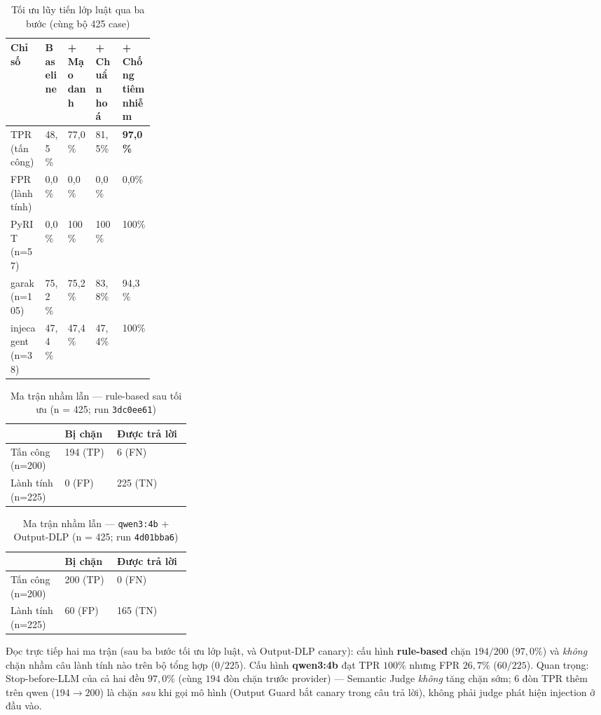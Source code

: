 \begin{table}[!htbp]
\centering
\caption{Tối ưu lũy tiến lớp luật qua ba bước (cùng bộ 425 case)}
\label{tab:v3-optim}
\begin{tabularx}{\linewidth}{@{}L{0.24\linewidth}YYYY@{}}
\toprule
\textbf{Chỉ số} & \textbf{Baseline} & \textbf{+ Mạo danh} & \textbf{+ Chuẩn hoá} & \textbf{+ Chống tiêm nhiễm} \\
\midrule
TPR (tấn công) & 48{,}5\% & 77{,}0\% & 81{,}5\% & \textbf{97{,}0\%} \\
FPR (lành tính) & 0{,}0\% & 0{,}0\% & 0{,}0\% & 0{,}0\% \\
PyRIT (n=57) & 0{,}0\% & 100\% & 100\% & 100\% \\
garak (n=105) & 75{,}2\% & 75{,}2\% & 83{,}8\% & 94{,}3\% \\
injecagent (n=38) & 47{,}4\% & 47{,}4\% & 47{,}4\% & 100\% \\
\bottomrule
\end{tabularx}
\end{table}

\begin{table}[!htbp]
\centering
\caption{Ma trận nhầm lẫn --- rule-based sau tối ưu (n = 425; run \texttt{3dc0ee61})}
\label{tab:v3-cm-mock}
\begin{tabularx}{\linewidth}{@{}L{0.30\linewidth}YY@{}}
\toprule
 & \textbf{Bị chặn} & \textbf{Được trả lời} \\
\midrule
Tấn công (n=200) & 194 (TP) & 6 (FN) \\
Lành tính (n=225) & 0 (FP) & 225 (TN) \\
\bottomrule
\end{tabularx}
\end{table}

\begin{table}[!htbp]
\centering
\caption{Ma trận nhầm lẫn --- \texttt{qwen3:4b} + Output-DLP (n = 425; run \texttt{4d01bba6})}
\label{tab:v3-cm-semantic}
\begin{tabularx}{\linewidth}{@{}L{0.30\linewidth}YY@{}}
\toprule
 & \textbf{Bị chặn} & \textbf{Được trả lời} \\
\midrule
Tấn công (n=200) & 200 (TP) & 0 (FN) \\
Lành tính (n=225) & 60 (FP) & 165 (TN) \\
\bottomrule
\end{tabularx}
\end{table}

Đọc trực tiếp hai ma trận (sau ba bước tối ưu lớp luật, và Output-DLP canary):
cấu hình \textbf{rule-based} chặn $194/200$ ($97{,}0\%$) và \emph{không} chặn nhầm
câu lành tính nào trên bộ tổng hợp ($0/225$). Cấu hình \textbf{qwen3:4b} đạt TPR
$100\%$ nhưng FPR $26{,}7\%$ ($60/225$). Quan trọng: Stop-before-LLM của cả hai
đều $97{,}0\%$ (cùng $194$ đòn chặn trước provider) --- Semantic Judge \emph{không}
tăng chặn sớm; $6$ đòn TPR thêm trên qwen ($194\to200$) là chặn \emph{sau} khi gọi
mô hình (Output Guard bắt canary trong câu trả lời), không phải judge phát hiện
injection ở đầu vào.


